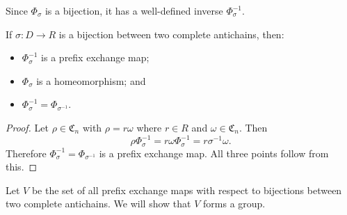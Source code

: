 \documentclass[12pt]{amsart}
\begin{document}
        Since $\Phi_\sigma$ is a bijection, it has a well-defined inverse $\Phi_\sigma^{-1}$.
        
        \begin{lemma}\label{phi-inverse-pem}
            If $\sigma: D \to R$ is a bijection between two complete antichains, then:
            
            \begin{itemize}
                \item $\Phi_\sigma^{-1}$ is a prefix exchange map;
                \item $\Phi_\sigma$ is a homeomorphism; and
                \item $\Phi_\sigma^{-1}=\Phi_{\sigma^{-1}}$.
            \end{itemize}
            
        \end{lemma}
        
        \begin{proof}
            Let $\rho \in \mathfrak{C}_n$ with $\rho = r  \omega $ where $r \in R$ and $ \omega  \in \mathfrak{C}_n$. Then $$\rho\Phi_\sigma^{-1} = r \omega  \Phi_\sigma^{-1} = r \sigma^{-1}  \omega .$$ Therefore $\Phi_\sigma^{-1}=\Phi_{\sigma^{-1}}$ is a prefix exchange map. All three points follow from this.
        \end{proof}
        
        
        \begin{comment}
        \begin{cor}\label{phi-homeo}
            If $\sigma: D \to R$ is a bijection between two complete antichains then the mapping $\Phi_\sigma$ is a homeomorphism.
        \end{cor}
        \begin{proof}
            From Lemma \ref{phi-bijection}, \ref{phi-inverse-pem}, and Theorem \ref{pem-cts}, $\Phi$ is a homeomorphism.  
        \end{proof}
        \begin{cor}\label{phi-homeo}
            If $\sigma: D \to R$ is a bijection between two complete antichains then the mapping $\Phi_\sigma^{-1}=\Phi_{\sigma^{-1}}$.
        \end{cor}
        \end{comment}

        
        Let $V$ be the set of all prefix exchange maps with respect to bijections between two complete antichains. We will show that $V$ forms a group.
        
\end{document}
